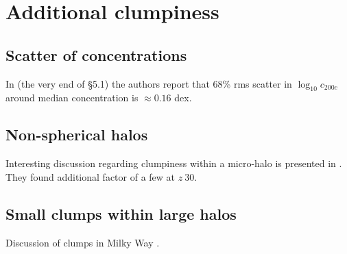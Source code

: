 
\section{Additional clumpiness}
\subsection{Scatter of concentrations}
In \cite{2014arXiv1407.4730D} (the very end of \S5.1) the authors report that 68\% rms scatter in $\log_{10}c_{200c}$ around median concentration is $\approx 0.16$ dex. 

\subsection{Non-spherical halos}
Interesting discussion regarding clumpiness within a micro-halo is presented in \citet{Anderhalden_2013}. They found additional factor of a few at $z~30$.

\subsection{Small clumps within large halos}
Discussion of clumps in Milky Way \cite{Belotsky_2014}.